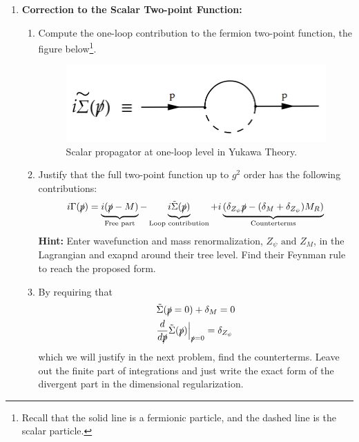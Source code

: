 \documentclass[11pt]{article}
\begin{document}
	\begin{enumerate}
		\item
		\begin{problem}{\points{-}}
			\textbf{Correction to the Scalar Two-point Function:}
			
			\begin{enumerate}
				\item 
			
			Compute the one-loop contribution to the fermion two-point function, the figure below\footnote{Recall that the solid line is a fermionic particle, and the dashed line is the scalar particle.}.
			
			\begin{figure}[H]
				\centering
				\includegraphics[width=0.45\linewidth]{img/1.png}
				\caption{Scalar propagator at one-loop level in Yukawa Theory.}
				\label{yukawa1}
			\end{figure}
			
		\item	Justify that the full two-point function up to $g^2$ order has the following contributions:
		\begin{equation*}
			i\Gamma(\slashed{p}) = \underbrace{i(\slashed{p}-M)}_{\text{Free part}} - \underbrace{i\tilde{\Sigma}(\slashed{p})}_{\text{Loop contribution}} + i \underbrace{(\delta_{Z_\psi}\slashed{p} - (\delta_M+\delta_{Z_\psi})M_R)}_{\text{Counterterms}}
		\end{equation*}
			\textbf{Hint:} Enter wavefunction and mass renormalization, $Z_\psi \text{ and } Z_M$, in the Lagrangian and exapnd around their tree level. Find their Feynman rule to reach the proposed form.
			\item 
			By requiring that
			\begin{equation}
				\begin{aligned}
					&\tilde{\Sigma}(\slashed{p} = 0) + \delta_M = 0
					\\&
					\frac{d}{d \slashed{p}} \tilde{\Sigma}(\slashed{p}) \Big|_{\slashed{p} = 0} = \delta_{Z_\psi}
				\end{aligned}
			\end{equation}
		which we will justify in the next problem, find the counterterms. Leave out the finite part of integrations and just write the exact form of the divergent part in the dimensional regularization.
		\end{enumerate}
	

\end{problem}
\end{enumerate}
\end{document}
